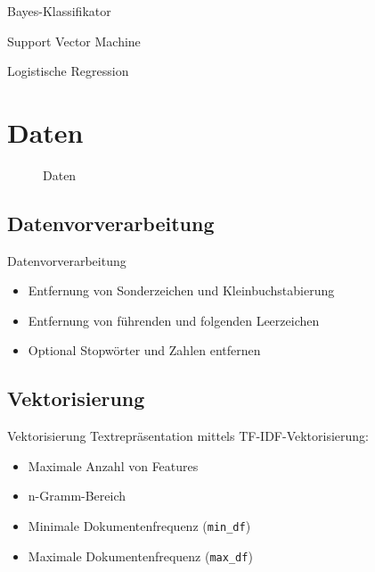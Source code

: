 \documentclass[aspectratio=169]{beamer} %
\begin{document}
\begin{frame}{Bayes-Klassifikator}
    
\end{frame}

\begin{frame}{Support Vector Machine}
    
\end{frame}

\begin{frame}{Logistische Regression}
    
\end{frame}

\section{Daten}

\begin{frame}
    \begin{figure}
        Daten
    \end{figure}
\end{frame}

\subsection{Datenvorverarbeitung}

\begin{frame}
    \begin{block}{Datenvorverarbeitung}
        \begin{itemize}
            \item Entfernung von Sonderzeichen und Kleinbuchstabierung
            \item Entfernung von führenden und folgenden Leerzeichen
            \item Optional Stopwörter und Zahlen entfernen
        \end{itemize}
    \end{block}
\end{frame}

\subsection{Vektorisierung}

\begin{frame}
    \begin{block}{Vektorisierung}
        Textrepräsentation mittels TF-IDF-Vektorisierung:
        \begin{itemize}
            \item Maximale Anzahl von Features
            \item n-Gramm-Bereich
            \item Minimale Dokumentenfrequenz (\texttt{min\_df})
            \item Maximale Dokumentenfrequenz (\texttt{max\_df})
        \end{itemize}
    \end{block}
\end{frame}
\end{document}
